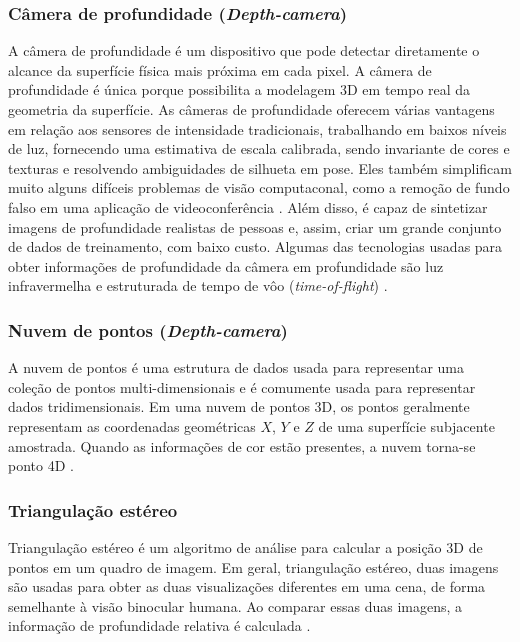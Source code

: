  \subsubsection{Câmera de profundidade (\textit{Depth-camera})}\label{sec:depth}
A câmera de profundidade é um dispositivo que pode detectar diretamente o alcance da superfície física mais próxima em cada pixel. A câmera de profundidade é única porque possibilita a modelagem 3D em tempo real da geometria da superfície. As câmeras de profundidade oferecem várias vantagens em relação aos sensores de intensidade tradicionais, trabalhando em baixos níveis de luz, fornecendo uma estimativa de escala calibrada, sendo invariante de cores e texturas e resolvendo ambiguidades de silhueta em pose. Eles também simplificam muito alguns difíceis problemas de visão computaconal, como a remoção de fundo falso em uma aplicação de videoconferência \cite{wilson2010combining}. Além disso, é capaz de sintetizar imagens de profundidade realistas de pessoas e, assim, criar um grande conjunto de dados de treinamento, com baixo custo. Algumas das tecnologias usadas para obter informações de profundidade da câmera em profundidade são luz infravermelha e estruturada de tempo de vôo (\textit{time-of-flight}) \cite{bogomjakov2006free}.


\subsubsection{Nuvem de pontos (\textit{Depth-camera})}\label{sec:nuvem}
A nuvem de pontos é uma estrutura de dados usada para representar uma coleção de pontos multi-dimensionais e é comumente usada para representar dados tridimensionais. Em uma nuvem de pontos 3D, os pontos geralmente representam as coordenadas geométricas $X$, $Y$ e $Z$ de uma superfície subjacente amostrada. Quando as informações de cor estão presentes, a nuvem torna-se ponto 4D \cite{gustavo2014Localizacao}.

\subsubsection{Triangulação estéreo }\label{sec:steroTriang}
Triangulação estéreo é um algoritmo de análise para calcular a posição 3D de pontos em um quadro de imagem. Em geral, triangulação estéreo, duas imagens são usadas para obter as duas visualizações diferentes em uma cena, de forma semelhante à visão binocular humana. Ao comparar essas duas imagens, a informação de profundidade relativa é calculada \cite{kinect4Windows}. 

